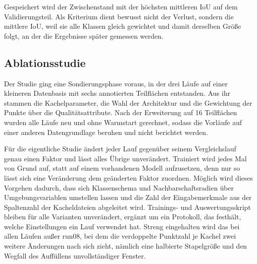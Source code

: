 Gespeichert wird der Zwischenstand mit der höchsten mittleren IoU auf dem Validierungsteil. Als Kriterium dient bewusst nicht der Verlust, sondern die mittlere IoU, weil sie alle Klassen gleich gewichtet und damit derselben Größe folgt, an der die Ergebnisse später gemessen werden.

\subsection{Ablationsstudie}\label{ablation}

Der Studie ging eine Sondierungsphase voraus, in der drei Läufe auf einer
kleineren Datenbasis mit sechs annotierten Teilflächen entstanden. Aus ihr
stammen die Kachelparameter, die Wahl der Architektur und die Gewichtung der
Punkte über die Qualitätsattribute. Nach der Erweiterung auf 16 Teilflächen
wurden alle Läufe neu und ohne Warmstart gerechnet, sodass die Vorläufe auf
einer anderen Datengrundlage beruhen und nicht berichtet werden.

Für die eigentliche Studie ändert jeder Lauf gegenüber seinem Vergleichslauf
genau einen Faktor und lässt alles Übrige unverändert. Trainiert wird jedes Mal von Grund auf, statt auf einem vorhandenen
Modell aufzusetzen, denn nur so lässt sich eine Veränderung dem geänderten
Faktor zuordnen. Möglich wird dieses Vorgehen dadurch, dass sich Klassenschema
und Nachbarschaftsradien über Umgebungsvariablen umstellen lassen und die Zahl
der Eingabemerkmale aus der Spaltenzahl der Kacheldateien abgeleitet wird.
Trainings- und Auswertungsskript bleiben für alle Varianten unverändert,
ergänzt um ein Protokoll, das festhält, welche Einstellungen ein Lauf verwendet
hat. Streng eingehalten wird das bei allen Läufen außer run08, bei dem die
verdoppelte Punktzahl je Kachel zwei weitere Änderungen nach sich zieht, nämlich
eine halbierte Stapelgröße und den Wegfall des Auffüllens unvollständiger
Fenster.

